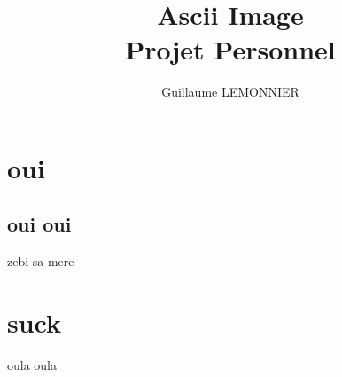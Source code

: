 \documentclass[a4paper,12pt]{article} %
\author{Guillaume LEMONNIER}
\title{Ascii Image\\Projet Personnel}
\begin{document}
\maketitle

\newpage

\tableofcontents

\newpage

\section{oui}

\subsection{oui oui}

zebi sa mere

\section{suck}

oula oula
\end{document}
